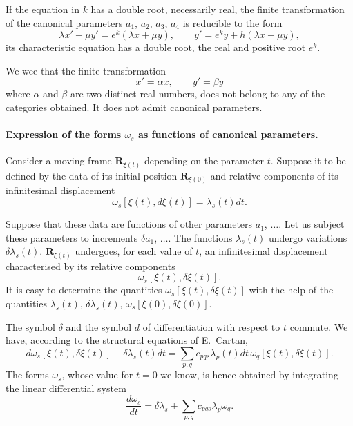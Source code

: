 \documentclass[leqno,11pt]{book}
\numberwithin{equation}{chapter}
\theoremstyle{shape1}
\theoremstyle{shapesmall}
\begin{document}
If the equation in $k$ has a double root, necessarily real, the finite transformation of the canonical parameters $a_{1}$, $a_{2}$, $a_{3}$, $a_{4}$ is reducible to the form
\begin{equation}
  \label{eq:13.16}
  \lambda x'+\mu y'=e^{k}(\lambda x+\mu y),\qquad y'=e^{k}y+h(\lambda x+\mu y),
\end{equation}
its characteristic equation has a double root, the real and positive root $e^{k}$.

We wee that the finite transformation
\[
x'=\alpha x,\qquad y'=\beta y
\]
where $\alpha$ and $\beta$ are two distinct real numbers, does not belong to any of the categories obtained. It does not admit canonical parameters.


\paragraph{Expression of the forms $\omega_{s}$ as functions of canonical parameters.}
\label{sec:202}
Consider a moving frame $\mathbf{R}_{\xi(t)}$ depending on the parameter $t$. Suppose it to be defined by the data of its initial position $\mathbf{R}_{\xi(0)}$ and relative components of its infinitesimal displacement
\[
\omega_{s}[\xi(t),d\xi(t)]=\lambda_{s}(t)dt.
\]

Suppose that these data are functions of other parameters $a_{1}$, $\dots$. Let us subject these parameters to increments $\delta a_{1}$, $\dots$. The functions $\lambda_{s}(t)$ undergo variations $\delta\lambda_{s}(t)$. $\mathbf{R}_{\xi(t)}$ undergoes, for each value of $t$, an infinitesimal displacement characterised by its relative components
\[
\omega_{s}[\xi(t),\delta\xi(t)].
\]
It is easy to determine the quantities $\omega_{s}[\xi(t),\delta\xi(t)]$ with the help of the quantities $\lambda_{s}(t)$, $\delta\lambda_{s}(t)$, $\omega_{s}[\xi(0),\delta\xi(0)]$.

The symbol $\delta$ and the symbol $d$ of differentiation with respect to $t$ commute. We have, according to the structural equations of E.~Cartan,
\[
d\omega_{s}[\xi(t),\delta\xi(t)]-\delta\lambda_{s}(t)dt=\sum_{p,q}c_{pqs}\lambda_{p}(t)dt\,\omega_{q}[\xi(t),\delta\xi(t)].
\]
The forms $\omega_{s}$, whose value for $t=0$ we know, is hence obtained by integrating the linear differential system
\begin{equation}
  \label{eq:13.17}
  \frac{d\omega_{s}}{dt}=\delta\lambda_{s}+\sum_{p,q}c_{pqs}\lambda_{p}\omega_{q}.
\end{equation}
\end{document}
